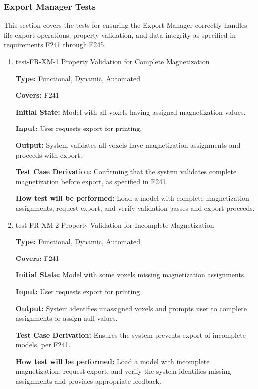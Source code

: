 \documentclass[12pt, titlepage]{article}
\begin{document}
\subsubsection{Export Manager Tests}

\noindent This section covers the tests for ensuring the Export Manager correctly
handles file export operations, property validation, and data integrity
as specified in requirements F241 through F245.

\begin{enumerate}

\item{test-FR-XM-1 Property Validation for Complete Magnetization\\}
\label{sec:t-xm-1}

\textbf{Type:} Functional, Dynamic, Automated

\textbf{Covers:} F241
					
\textbf{Initial State:} Model with all voxels having assigned magnetization values.
					
\textbf{Input:} User requests export for printing.
					
\textbf{Output:} System validates all voxels have magnetization assignments and proceeds with export.

\textbf{Test Case Derivation:} Confirming that the system validates complete magnetization before export, as specified in F241.
					
\textbf{How test will be performed:} Load a model with complete magnetization assignments, request export, and verify validation passes and export proceeds.

\item{test-FR-XM-2 Property Validation for Incomplete Magnetization\\}
\label{sec:t-xm-2}

\textbf{Type:} Functional, Dynamic, Automated

\textbf{Covers:} F241
					
\textbf{Initial State:} Model with some voxels missing magnetization assignments.
					
\textbf{Input:} User requests export for printing.
					
\textbf{Output:} System identifies unassigned voxels and prompts user to complete assignments or assign null values.

\textbf{Test Case Derivation:} Ensures the system prevents export of incomplete models, per F241.
					
\textbf{How test will be performed:} Load a model with incomplete magnetization, request export, and verify the system identifies missing assignments and provides appropriate feedback.


\end{enumerate}
\end{document}
